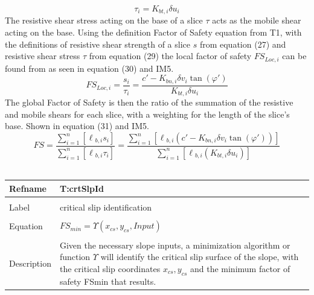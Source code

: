 \documentclass[12pt]{article}
\begin{document}
\begin{equation}
\tau{}_{i}=K_{bt,i}{\delta{}u}_{i}
\end{equation}
The resistive shear stress acting on the base of a slice $\tau{}$ acts as the mobile shear acting on the base. Using the definition Factor of Safety equation from T1, with the definitions of resistive shear strength of a slice $s$ from equation (27) and resistive shear stress $\tau{}$ from equation (29) the local factor of safety $FS_{Loc,i}$ can be found from as seen in equation (30) and IM5.
\begin{equation}
FS_{Loc,i}=\frac{s_{i}}{\tau{}_{i}}=\frac{c'-K_{bn,i}{\delta{}v}_{i}\tan\left(\varphi{}'\right)}{K_{bt,i}{\delta{}u}_{i}}
\end{equation}
The global Factor of Safety is then the ratio of the summation of the resistive and mobile shears for each slice, with a weighting for the length of the slice's base. Shown in equation (31) and IM5.
\begin{equation}
FS=\frac{\displaystyle\sum_{i=1}^{n}{\left[\ell{}_{b,i}s_{i}\right]}}{\displaystyle\sum_{i=1}^{n}{\left[\ell{}_{b,i}\tau{}_{i}\right]}}=\frac{\displaystyle\sum_{i=1}^{n}{\left[\ell{}_{b,i}\left(c'-K_{bn,i}{\delta{}v}_{i}\tan\left(\varphi{}'\right)\right)\right]}}{\displaystyle\sum_{i=1}^{n}{\left[\ell{}_{b,i}\left(K_{bt,i}{\delta{}u}_{i}\right)\right]}}
\end{equation}
~\newline
\noindent \begin{minipage}{\textwidth}
\begin{tabular}{p{} p{}}
\toprule \textbf{Refname} & \textbf{T:crtSlpId}
\label{T:crtSlpId}
\\ \midrule \\
Label & critical slip identification
\\ \midrule \\
Equation & $FS_{min}=\Upsilon{}\left({x_{cs},y_{cs}},Input\right)$
\\ \midrule \\
Description & Given the necessary slope inputs, a minimization algorithm or function $\Upsilon{}$ will identify the critical slip surface of the slope, with the critical slip coordinates ${x_{cs},y_{cs}}$ and the minimum factor of safety FSmin that results.
\\ \bottomrule \end{tabular}
\end{minipage}\\
\end{document}
